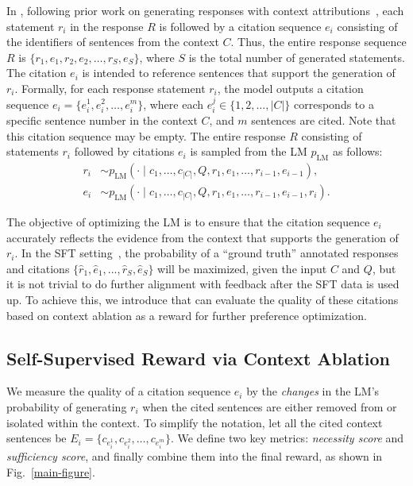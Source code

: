 In \ours, following prior work on generating responses with context attributions~\citep{zhang2024longcite}, each statement $r_i$ in the response $R$ is followed by a citation sequence $e_i$ consisting of the identifiers of sentences from the context $C$.
Thus, the entire response sequence $R$ is $\{r_{1}, e_{1}, r_{2}, e_{2}, \dots, r_{S}, e_{S}\}$, where $S$ is the total number of generated statements.
The citation $e_i$ is intended to reference sentences that support the generation of $r_i$. Formally, for each response statement $r_i$, the model outputs a citation sequence $e_i = \{e_{i}^{1}, e_{i}^{2}, \dots, e_{i}^{m}\}$, where each $e_{i}^{j} \in \{1, 2, \dots, |C|\}$ corresponds to a specific sentence number in the context $C$, and $m$ sentences are cited.
Note that this citation sequence may be empty.
The entire response $R$ consisting of statements $r_i$ followed by citations $e_i$ is sampled from the LM $p_\text{LM}$ as follows:
\begin{align*}
r_i &\sim p_{\text{LM}}\left(\cdot \mid c_1, \hdots, c_{|C|}, Q, r_1, e_1, \hdots, r_{i-1}, e_{i-1}\right), \\
e_i &\sim p_{\text{LM}}\left(\cdot \mid c_1, \hdots, c_{|C|}, Q, r_1, e_1, \hdots, r_{i-1}, e_{i-1}, r_{i}\right).
\end{align*}

The objective of optimizing the LM is to ensure that the citation sequence $e_i$ accurately reflects the evidence from the context that supports the generation of $r_i$. 
In the SFT setting~\citep{zhang2024longcite}, the probability of a ``ground truth'' annotated responses and citations $\{\hat{r}_1, \hat{e}_1, ..., \hat{r}_{S}, \hat{e}_{S}\}$ will be maximized, given the input $C$ and $Q$, but it is not trivial to do further alignment with feedback after the SFT data is used up. 
To achieve this, we introduce \ours that can evaluate the quality of these citations based on context ablation as a reward for further preference optimization.

\subsection{Self-Supervised Reward via Context Ablation} 
\label{sec:reward}

We measure the quality of a citation sequence $e_i$ by the \emph{changes} in the LM’s probability of generating $r_i$ when the cited sentences are either removed from or isolated within the context. To simplify the notation, let all the cited context sentences be $E_i = \{c_{e_i^1}, c_{e_i^2}, \dots, c_{e_i^m}\}$. We define two key metrics: \emph{necessity score} and \emph{sufficiency score}, and finally combine them into the final reward, as shown in Fig.~\ref{main-figure}.

